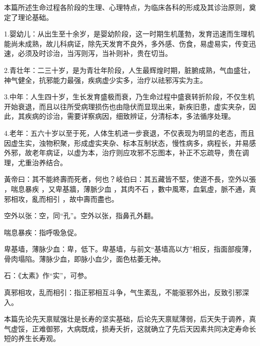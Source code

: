\documentclass[draft,12pt]{ctexbook}
\begin{document}


本篇所述生命过程各阶段的生理、心理特点，为临床各科的形成及其诊治原则，奠定了理论基础。

1.婴幼儿：从出生至十余岁，是婴幼阶段，这一时期生机蓬勃，发育迅速而生理机能尚未成熟，故儿科病证，除先天发育不良外，多外感、伤食，易虚易实，传变迅速，必须及时诊治，当泻则泻，当补则补，贵在切当。

2.青壮年：二三十岁，是为青壮年阶段，人生最辉煌时期，脏腑成熟，气血盛壮，神气健全，抗邪能力最强，疾病虚少实多，治疗以祛邪泻实为主。

3.中年：人生四十岁，生长发育盛极而衰，乃生命过程中盛衰转折阶段，不仅生机开始衰退，而且以往所受病理损伤也由隐伏而显现出来，新疾旧患，虚实夹杂，因此，其疾病的诊治，需要详察病因，细致辨证，分清标本，多法循序处理。

4.老年：五六十岁以至于死，人体生机进一步衰退，不仅表现为明显的老态，而且因虚生实，浊物积聚，形成虚实夹杂、标本互制状态，慢性病多，病程长，并易感外邪，故老年病证，以虚为本，治疗则应攻邪不忘图本，补正不忘疏导，贵在调理，尤重治养结合。


\begin{yuanwen}
黃帝曰：其不能終壽而死者，何也？岐伯曰：其五藏皆不堅，使道不長，空外以張 ，喘息暴疾 ，又卑基牆，薄脈少血 ，其肉不石 ，數中風寒，血氣虛，脈不通，真邪相攻，亂而相引 ，故中壽而盡也。
\end{yuanwen}


\begin{jiaozhu}
	\item 空外以张：空，同“孔”。空外以张，指鼻孔外翻。
	\item 喘息暴疾：指呼吸急促。
	\item 卑基墙，薄脉少血：卑，低下。卑基墙，与前文“基墙高以方”相反，指面部瘦薄，骨肉塌陷。薄脉少血，即脉小血少，面色枯萎无神。
	\item 石：《太素》作“实”，可参。
	\item 真邪相攻，乱而相引：指正邪相互斗争，气生紊乱，不能驱邪外出，反致引邪深入。
\end{jiaozhu}



本篇先论先天禀赋强壮是长寿的坚实基础，后论先天禀赋薄弱，后天失于调养，真气虚馁，正难御邪，大病既成，损寿夭折，这就确立了先后天因素共同决定寿命长短的养生长寿观。
\end{document}
